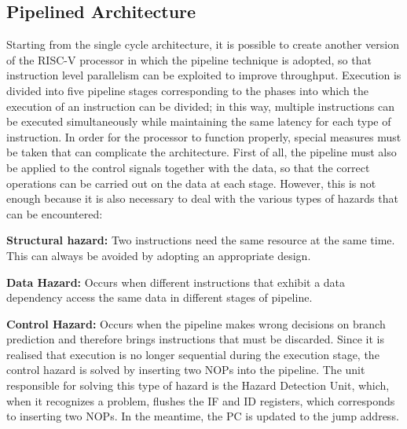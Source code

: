 \subsection{Pipelined Architecture}
\label{subsection:pipe_arch}
Starting from the single cycle architecture, it is possible to create another version of the RISC-V processor in which the pipeline technique is adopted, so that instruction level parallelism can be exploited to improve throughput.
Execution is divided into five pipeline stages corresponding to the phases into which the execution of an instruction can be divided; in this way, multiple instructions can be executed simultaneously while maintaining the same latency for each type of instruction.
In order for the processor to function properly, special measures must be taken that can complicate the architecture. First of all, the pipeline must also be applied to the control signals together with the data, so that the correct operations can be carried out on the data at each stage.
However, this is not enough because it is also necessary to deal with the various types of hazards that can be encountered:
\begin{description}
\item \textbf{Structural hazard:} Two instructions need the same resource at the same time. This can always be avoided by adopting an appropriate design.

\item \textbf{Data Hazard:} Occurs when different instructions that exhibit a data dependency access the same data in different stages of pipeline.

\item \textbf{Control Hazard:} Occurs when the pipeline makes wrong decisions on branch prediction and therefore brings instructions that must be discarded. Since it is realised that execution is no longer sequential during the execution stage, the control hazard is solved by inserting two NOPs into the pipeline. The unit responsible for solving this type of hazard is the Hazard Detection Unit, which, when it recognizes a problem, flushes the IF and ID registers, which corresponds to inserting two NOPs. In the meantime, the PC is updated to the jump address.
\end{description}
